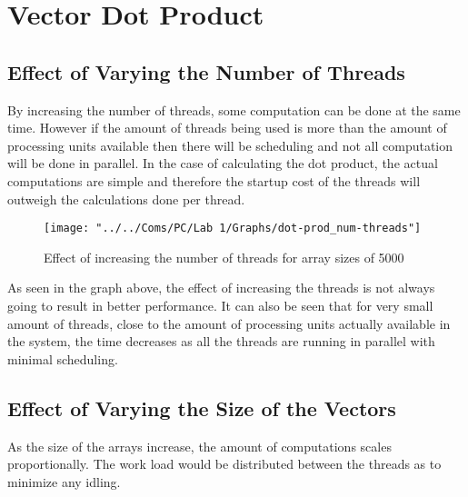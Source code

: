 \documentclass[paper=a4, fontsize=11pt]{scrartcl} %
\numberwithin{equation}{section} %
\numberwithin{figure}{section} %
\numberwithin{table}{section} %
\begin{document}

\section{Vector Dot Product}


\subsection{Effect of Varying the Number of Threads}
By increasing the number of threads, some computation can be done at the same time. However if the amount of threads being used is more than the amount of processing units available then there will be scheduling and not all computation will be done in parallel. In the case of calculating the dot product, the actual computations are simple and therefore the startup cost of the threads will outweigh the calculations done per thread. 

	\begin{figure}[!h]
		\centering
		\texttt{[image: "../../Coms/PC/Lab 1/Graphs/dot-prod\_num-threads"]}
		\caption{Effect of increasing the number of threads for array sizes of 5000}
	\end{figure}

As seen in the graph above, the effect of increasing the threads is not always going to result in better performance. It can also be seen that for very small amount of threads, close to the amount of processing units actually available in the system, the time decreases as all the threads are running in parallel with minimal scheduling.

\newpage


\subsection{Effect of Varying the Size of the Vectors}
As the size of the arrays increase, the amount of computations scales proportionally. The work load would be distributed between the threads as to minimize any idling.
\end{document}
